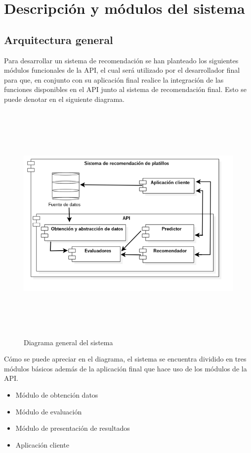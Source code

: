 \section {Descripción y módulos del sistema}

  \subsection{Arquitectura general}
    Para desarrollar un sistema de recomendación se han planteado los siguientes módulos funcionales de la API, el cual será utilizado por el desarrollador final para que, en conjunto con su aplicación final realice la integración de las funciones disponibles en el API junto al sistema de recomendación final. Esto se puede denotar en el siguiente diagrama.

\newpage
    \begin{landscape}
      \begin{figure}[h!]
      \centering
      \includegraphics[width=22.5cm,height=12cm]{./images/architecture.png}
      \caption{Diagrama general del sistema}
    \end{figure}
    \end{landscape}
  \newpage

Cómo se puede apreciar en el diagrama, el sistema se encuentra dividido en tres módulos básicos además de la aplicación final que hace uso de los módulos de la API.
    \begin{itemize}
    \item Módulo de obtención datos
    \item Módulo de evaluación
    \item Módulo de presentación de resultados
    \item Aplicación cliente
  \end{itemize}

